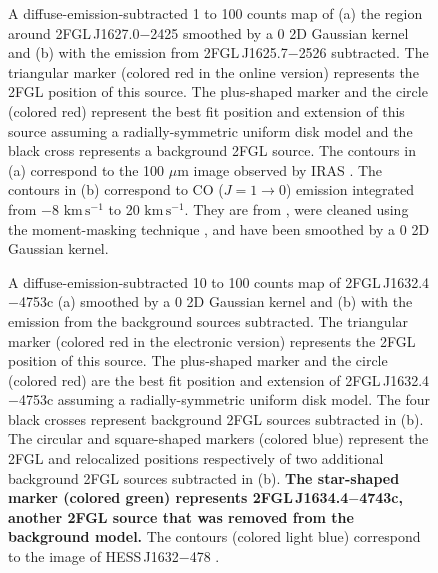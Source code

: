 \documentclass[12pt,preprint]{aastex}
\newif\ifcolorfigure
\newcommand{\gev}{\text{GeV}\xspace}
\newcommand{\tev}{\text{TeV}\xspace}
\newcommand{\s}{\text{s}\xspace}
\newcommand{\km}{\text{km}\xspace}
\newcommand{\newtext}[1]{{\bfseries \color{red}#1}}
\begin{document}
\begin{figure}
    \ifcolorfigure
      \plotone{source_plots/source_Ophiuchus_color.eps}
    \else
    \fi
  \caption{
  A diffuse-emission-subtracted 1 \gev to 100 \gev counts map of (a) the region
  around 2FGL\,J1627.0$-$2425 smoothed by a 0 2D Gaussian kernel and (b)
  with the emission from 2FGL\,J1625.7$-$2526
  subtracted.  The triangular marker 
  (colored red in the
  online version) represents the 2FGL position of this source.
  The plus-shaped marker and the circle (colored red) 
  represent the best fit position and extension of this
  source assuming a radially-symmetric uniform disk model
  and the black cross represents a background 2FGL source. 
  The
  contours in (a) correspond to the 100 $\mu$m image observed by
  IRAS \citep{iras_rho_ophiuci}.  The contours in (b) correspond to
  CO ($J=1\rightarrow 0$) emission integrated from $-$8 $\km\,\s^{-1}$
  to 20 $\km\,\s^{-1}$.  They are from \cite{co_rho_ophiuci}, were cleaned using
  the moment-masking technique \citep{masking_moment_2011}, and have
  been smoothed by a 0 2D Gaussian kernel.
  }\label{1FGL_J1628.6-2419c}
\end{figure}

\begin{figure}
    \ifcolorfigure
      \plotone{source_plots/source_HESS_J1632-478_color.eps}
    \else
    \fi
  \caption{
  A diffuse-emission-subtracted 10 \gev to 100 \gev counts map of
  2FGL\,J1632.4$-$4753c (a) smoothed by a 0 2D Gaussian
  kernel and (b) with the emission from the background sources subtracted.  
  The triangular marker (colored red in the electronic version)
  represents the 2FGL position of this source.  The plus-shaped marker
  and the circle (colored red) are the best fit position and extension of
  2FGL\,J1632.4$-$4753c assuming a radially-symmetric uniform disk model.  
  The four black crosses represent background 2FGL
  sources subtracted in (b).  The 
  circular and square-shaped markers (colored blue) represent 
  the 2FGL and relocalized positions respectively of two
  additional background 2FGL sources subtracted in (b).
  \newtext{The star-shaped marker (colored green) represents 
  2FGL\,J1634.4$-$4743c, another 2FGL source that was removed from the background model.}
  The contours (colored light blue) correspond to the \tev image of
  HESS\,J1632$-$478 \citep{hess_plane_survey}.
  }\label{1FGL_J1632.9-4802c}
\end{figure}
\end{document}

